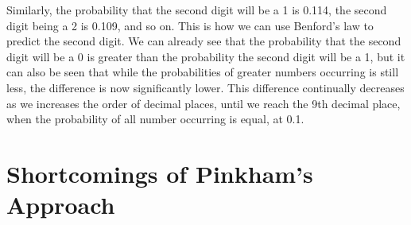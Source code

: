 \documentclass[12pt, titlepage]{article}
\begin{document}
Similarly, the probability that the second digit will be a 1 is 0.114, the second digit being a 2 is 0.109, and so on. This is how we can use Benford's law to predict the second digit. We can already see that the probability that the second digit will be a 0 is greater than the probability the second digit will be a 1, but it can also be seen that while the probabilities of greater numbers occurring is still less, the difference is now significantly lower. This difference continually decreases as we increases the order of decimal places, until we reach the 9th decimal place, when the probability of all number occurring is equal, at 0.1.

\section{Shortcomings of Pinkham's Approach}
\end{document}
